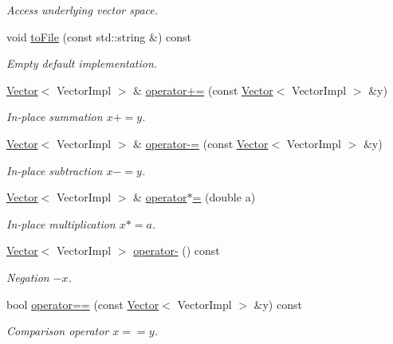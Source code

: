 \begin{DoxyCompactItemize}
\begin{DoxyCompactList}\small\item\em Access underlying vector space. \end{DoxyCompactList}\item 
\hypertarget{classSpacy_1_1VectorBase_a244a3e85ec49dbf2741ca46ea4b711c9}{}void \hyperlink{classSpacy_1_1VectorBase_a244a3e85ec49dbf2741ca46ea4b711c9}{to\+File} (const std\+::string \&) const \label{classSpacy_1_1VectorBase_a244a3e85ec49dbf2741ca46ea4b711c9}

\begin{DoxyCompactList}\small\item\em Empty default implementation. \end{DoxyCompactList}\item 
\hyperlink{classSpacy_1_1Generic_1_1Vector}{Vector}$<$ Vector\+Impl $>$ \& \hyperlink{classSpacy_1_1AddArithmeticOperators_afad1d01e1e8c6f75290ac46d9b047ea8}{operator+=} (const \hyperlink{classSpacy_1_1Generic_1_1Vector}{Vector}$<$ Vector\+Impl $>$ \&y)
\begin{DoxyCompactList}\small\item\em In-\/place summation $ x+=y$. \end{DoxyCompactList}\item 
\hyperlink{classSpacy_1_1Generic_1_1Vector}{Vector}$<$ Vector\+Impl $>$ \& \hyperlink{classSpacy_1_1AddArithmeticOperators_a9fa91e177d13203cfe8cfa991c64ca36}{operator-\/=} (const \hyperlink{classSpacy_1_1Generic_1_1Vector}{Vector}$<$ Vector\+Impl $>$ \&y)
\begin{DoxyCompactList}\small\item\em In-\/place subtraction $ x-=y$. \end{DoxyCompactList}\item 
\hyperlink{classSpacy_1_1Generic_1_1Vector}{Vector}$<$ Vector\+Impl $>$ \& \hyperlink{classSpacy_1_1AddArithmeticOperators_a1d3db95b24fd2bc1de712c9e04c47e2f}{operator$\ast$=} (double a)
\begin{DoxyCompactList}\small\item\em In-\/place multiplication $ x*=a$. \end{DoxyCompactList}\item 
\hyperlink{classSpacy_1_1Generic_1_1Vector}{Vector}$<$ Vector\+Impl $>$ \hyperlink{classSpacy_1_1AddArithmeticOperators_a5acd030bf265d130983fd6e3c5b68be5}{operator-\/} () const
\begin{DoxyCompactList}\small\item\em Negation $ -x$. \end{DoxyCompactList}\item 
bool \hyperlink{classSpacy_1_1AddArithmeticOperators_a5ff1909f49f4a705d69663dc2d4b6316}{operator==} (const \hyperlink{classSpacy_1_1Generic_1_1Vector}{Vector}$<$ Vector\+Impl $>$ \&y) const
\begin{DoxyCompactList}\small\item\em Comparison operator $ x==y$. \end{DoxyCompactList}\end{DoxyCompactItemize}


